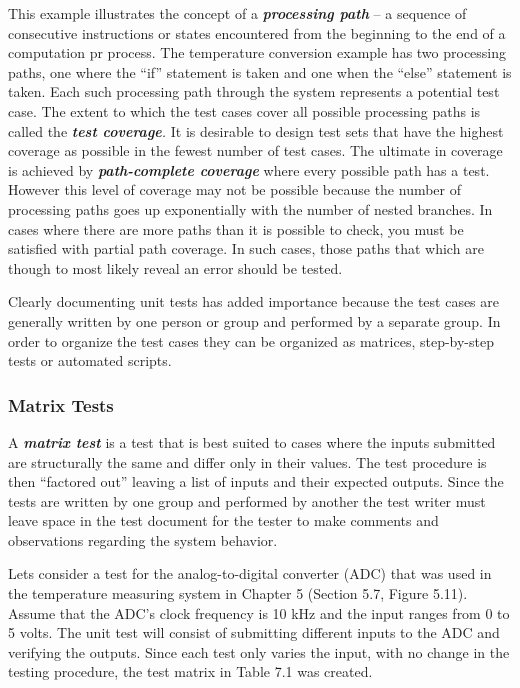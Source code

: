 This example illustrates the concept of a \emph{\textbf{processing
path}} -- a sequence of consecutive instructions or states encountered
from the beginning to the end of a computation pr process. The
temperature conversion example has two processing paths, one where the
``if'' statement is taken and one when the ``else'' statement is taken.
Each such processing path through the system represents a potential test
case. The extent to which the test cases cover all possible processing
paths is called the \emph{\textbf{test coverage}.} It is desirable to
design test sets that have the highest coverage as possible in the
fewest number of test cases. The ultimate in coverage is achieved by
\textbf{\emph{path-complete coverage}} where every possible path has a
test. However this level of coverage may not be possible because the
number of processing paths goes up exponentially with the number of
nested branches. In cases where there are more paths than it is possible
to check, you must be satisfied with partial path coverage. In such
cases, those paths that which are though to most likely reveal an error
should be tested.

Clearly documenting unit tests has added importance because the test
cases are generally written by one person or group and performed by a
separate group. In order to organize the test cases they can be
organized as matrices, step-by-step tests or automated scripts.

\subsubsection*{Matrix Tests}\label{matrix-tests}

A \emph{\textbf{matrix test}} is a test that is best suited to cases
where the inputs submitted are structurally the same and differ only in
their values. The test procedure is then ``factored out'' leaving a list
of inputs and their expected outputs. Since the tests are written by one
group and performed by another the test writer must leave space in the
test document for the tester to make comments and observations regarding
the system behavior.

Lets consider a test for the analog-to-digital converter (ADC) that was
used in the temperature measuring system in Chapter 5 (Section 5.7,
Figure 5.11). Assume that the ADC's clock frequency is 10 kHz and the
input ranges from 0 to 5 volts. The unit test will consist of submitting
different inputs to the ADC and verifying the outputs. Since each test
only varies the input, with no change in the testing procedure, the test
matrix in Table 7.1 was created.

